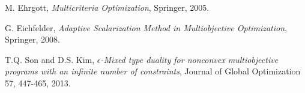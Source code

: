 \documentclass[12pt,a4paper]{report}
\begin{document}
\begin{thebibliography}{99}
	\thispagestyle{fancy}
	
	
	
	
	 M. Ehrgott, {\it Multicriteria Optimization}, Springer, 2005.
	
	 G. Eichfelder, {\it Adaptive Scalarization Method in Multiobjective Optimization}, Springer, 2008.
	
	 T.Q. Son and D.S. Kim, {\it  $\epsilon$-Mixed type duality for nonconvex multiobjective programs with an infinite number of constraints}, Journal of Global Optimization 57,  447-465, 2013.
	
	
\end{thebibliography}
\end{document}
